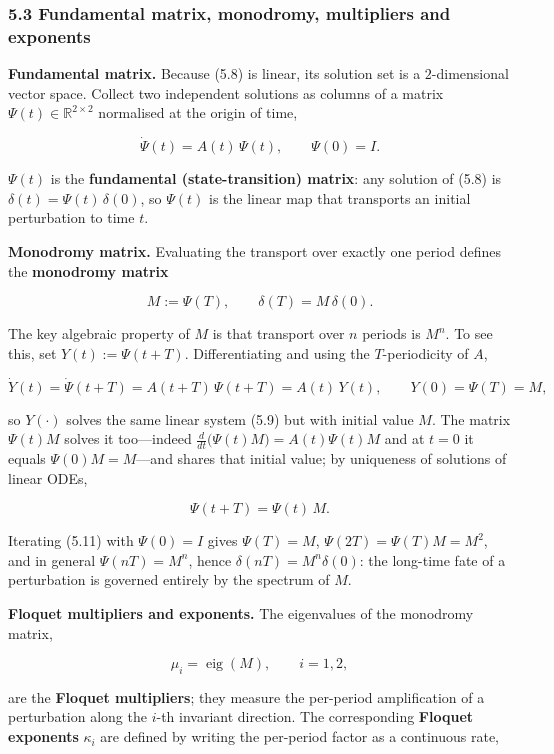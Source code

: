 \documentclass[
  11pt,
]{article}
\begin{document}
\subsubsection{5.3 Fundamental matrix, monodromy, multipliers and
exponents}\label{fundamental-matrix-monodromy-multipliers-and-exponents}

\textbf{Fundamental matrix.} Because (5.8) is linear, its solution set
is a \(2\)-dimensional vector space. Collect two independent solutions
as columns of a matrix \(\Psi(t)\in\mathbb{R}^{2\times2}\) normalised at
the origin of time,

\[
\dot\Psi(t)=A(t)\,\Psi(t),\qquad \Psi(0)=I .
\tag{5.9}
\]

\(\Psi(t)\) is the \textbf{fundamental (state-transition) matrix}: any
solution of (5.8) is \(\delta(t)=\Psi(t)\,\delta(0)\), so \(\Psi(t)\) is
the linear map that transports an initial perturbation to time \(t\).

\textbf{Monodromy matrix.} Evaluating the transport over exactly one
period defines the \textbf{monodromy matrix}

\[
M:=\Psi(T),\qquad \delta(T)=M\,\delta(0).
\tag{5.10}
\]

The key algebraic property of \(M\) is that transport over \(n\) periods
is \(M^n\). To see this, set \(Y(t):=\Psi(t+T)\). Differentiating and
using the \(T\)-periodicity of \(A\),

\[
\dot Y(t)=\dot\Psi(t+T)=A(t+T)\,\Psi(t+T)=A(t)\,Y(t),\qquad Y(0)=\Psi(T)=M,
\]

so \(Y(\cdot)\) solves the same linear system (5.9) but with initial
value \(M\). The matrix \(\Psi(t)M\) solves it too---indeed
\(\tfrac{d}{dt}\big(\Psi(t)M\big)=A(t)\Psi(t)M\) and at \(t=0\) it
equals \(\Psi(0)M=M\)---and shares that initial value; by uniqueness of
solutions of linear ODEs,

\[
\Psi(t+T)=\Psi(t)\,M .
\tag{5.11}
\]

Iterating (5.11) with \(\Psi(0)=I\) gives \(\Psi(T)=M\),
\(\Psi(2T)=\Psi(T)M=M^2\), and in general \(\Psi(nT)=M^n\), hence
\(\delta(nT)=M^n\delta(0)\): the long-time fate of a perturbation is
governed entirely by the spectrum of \(M\).

\textbf{Floquet multipliers and exponents.} The eigenvalues of the
monodromy matrix,

\[
\mu_i=\operatorname{eig}(M),\qquad i=1,2,
\tag{5.12}
\]

are the \textbf{Floquet multipliers}; they measure the per-period
amplification of a perturbation along the \(i\)-th invariant direction.
The corresponding \textbf{Floquet exponents} \(\kappa_i\) are defined by
writing the per-period factor as a continuous rate,
\end{document}
